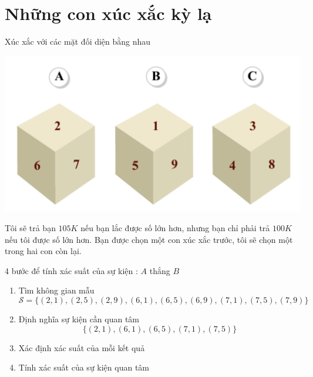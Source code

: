 \section{Những con xúc xắc kỳ lạ}
\begin{frame}
  \begin{block}{Xúc xắc với các mặt đối diện bằng nhau}
    \begin{center}
      \includegraphics [scale = 0.5]{xucxac.pdf} 
    \end{center}
  \end{block}
Tôi sẽ trả bạn $105K$ nếu bạn lắc được số lớn hơn, nhưng bạn chỉ phải trả $100K$ nếu tôi được số lớn hơn. Bạn được chọn một con xúc xắc trước, tôi sẽ chọn một trong hai con còn lại. 
\end{frame}

\begin{frame}{4 bước để tính xác suất của sự kiện : $A$ thắng $B$}
  \begin{enumerate}
  \item Tìm không gian mẫu 
    $$
    \mathcal{S} = \{(2,1),(2,5),(2,9),(6,1),(6,5),(6,9), (7,1),(7,5),(7,9) \}
    $$
  \item Định nghĩa sự kiện cần quan tâm 
    $$
    \{(2,1), (6,1), (6,5), (7,1), (7,5)\}
    $$

  \item Xác định xác suất của mỗi kết quả
  \item Tính xác suất của sự kiện quan tâm
  \end{enumerate}
\end{frame}


